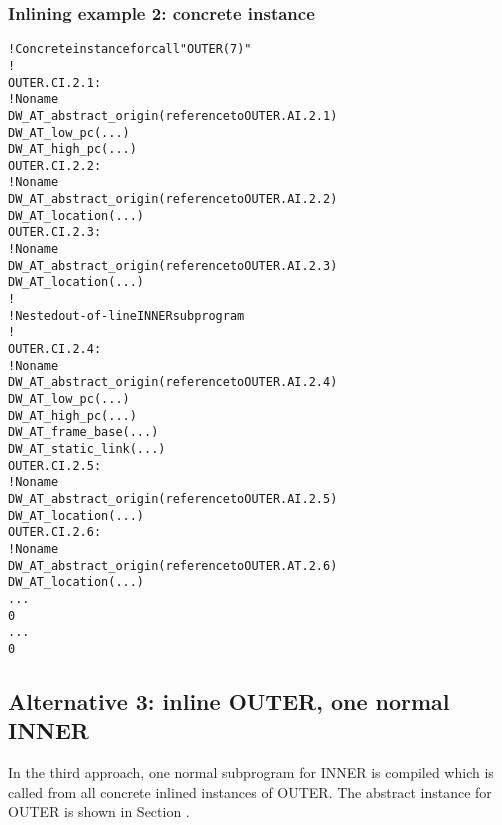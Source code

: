 \subsubsection{Inlining example 2: concrete instance}
\label{app:inliningexample2concreteinstance}
\begin{alltt}

    ! Concrete instance for call "OUTER(7)"
    !
OUTER.CI.2.1:
        ! No name
        DW\-\_AT\-\_abstract\-\_origin(reference to OUTER.AI.2.1)
        DW\-\_AT\-\_low\-\_pc(...)
        DW\-\_AT\-\_high\-\_pc(...)
OUTER.CI.2.2:
            ! No name
            DW\-\_AT\-\_abstract\-\_origin(reference to OUTER.AI.2.2)
            DW\-\_AT\-\_location(...)
OUTER.CI.2.3:
            ! No name
            DW\-\_AT\-\_abstract\-\_origin(reference to OUTER.AI.2.3)
            DW\-\_AT\-\_location(...)
        !
        ! Nested out-of-line INNER subprogram
        !
OUTER.CI.2.4:
            ! No name
            DW\-\_AT\-\_abstract\-\_origin(reference to OUTER.AI.2.4)
            DW\-\_AT\-\_low\-\_pc(...)
            DW\-\_AT\-\_high\-\_pc(...)
            DW\-\_AT\-\_frame\-\_base(...)
            DW\-\_AT\-\_static\-\_link(...)
OUTER.CI.2.5:
                ! No name
                DW\-\_AT\-\_abstract\-\_origin(reference to OUTER.AI.2.5)
                DW\-\_AT\-\_location(...)
OUTER.CI.2.6:
                ! No name
                DW\-\_AT\-\_abstract\-\_origin(reference to OUTER.AT.2.6)
                DW\-\_AT\-\_location(...)
            ...
            0
        ...
        0
\end{alltt}

\subsection{Alternative 3: inline OUTER, one normal INNER}
\label{app:inlineouteronenormalinner}

In the third approach, one normal subprogram for INNER is
compiled which is called from all concrete inlined instances of
OUTER. The abstract instance for OUTER is shown in 
Section .

